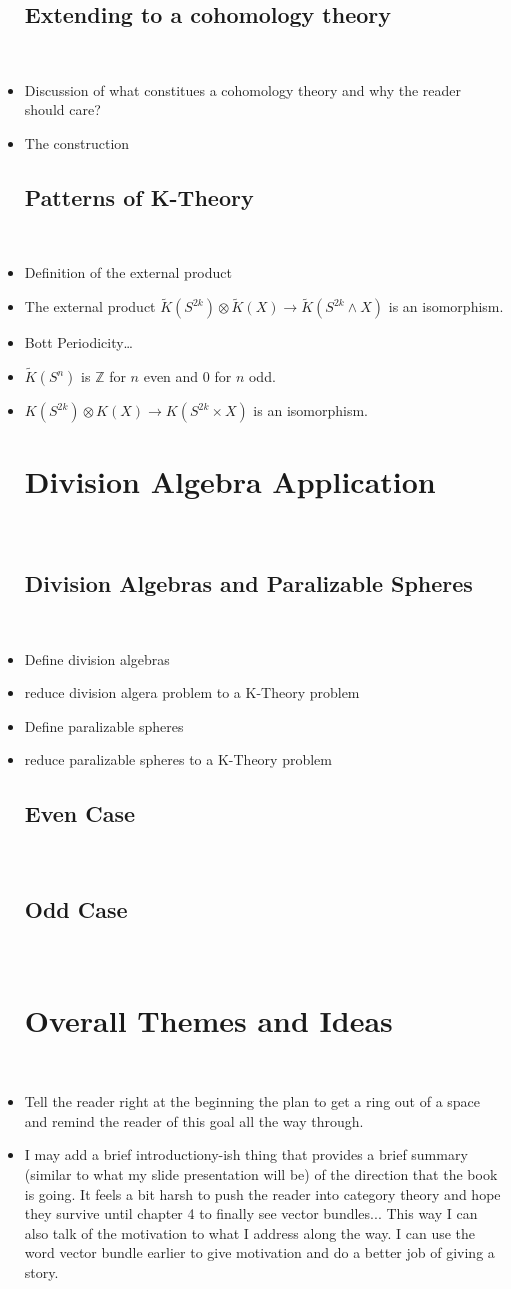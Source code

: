 \documentclass[12]{amsart}
\newcommand{\KR}{\widetilde{K}}
\newcommand{\Z}{\mathbb{Z}}
\newcommand{\ot}{\otimes}
\newcommand{\itemo}{\item[$\circ$]}
\begin{document}
\begin{itemize}
\subsection{Extending to a cohomology theory}~
    \item Discussion of what constitues a cohomology theory and why the reader should care?
    \item The construction

\subsection{Patterns of K-Theory}~
    \item Definition of the external product
	\item The external product $\KR(S^{2k}) \ot \KR(X) \to \KR(S^{2k} \wedge X)$ is an isomorphism.
    \item Bott Periodicity\dots
    \item $\KR(S^n)$ is $\Z$ for $n$ even and $0$ for $n$ odd.
   	\item $K(S^{2k}) \ot K(X) \to K(S^{2k} \times X)$ is an isomorphism.

\section{Division Algebra Application}~
\subsection{Division Algebras and Paralizable Spheres}~
    \item Define division algebras
    \item reduce division algera problem to a K-Theory problem
    \itemo Define paralizable spheres
    \itemo reduce paralizable spheres to a K-Theory problem
\subsection{Even Case}~

\subsection{Odd Case}~
        
        \section{Overall Themes and Ideas}~
    \item Tell the reader right at the beginning the plan to get a ring out of a space and remind the reader of this goal all the way through.
    \item I may add a brief introductiony-ish thing that provides a brief summary (similar to what my slide presentation will be) of the direction that the book is going. It feels a bit harsh to push the reader into category theory and hope they survive until chapter 4 to finally see vector bundles... This way I can also talk of the motivation to what I address along the way. I can use the word vector bundle earlier to give motivation and do a better job of giving a story.
\end{itemize}
\end{document}
